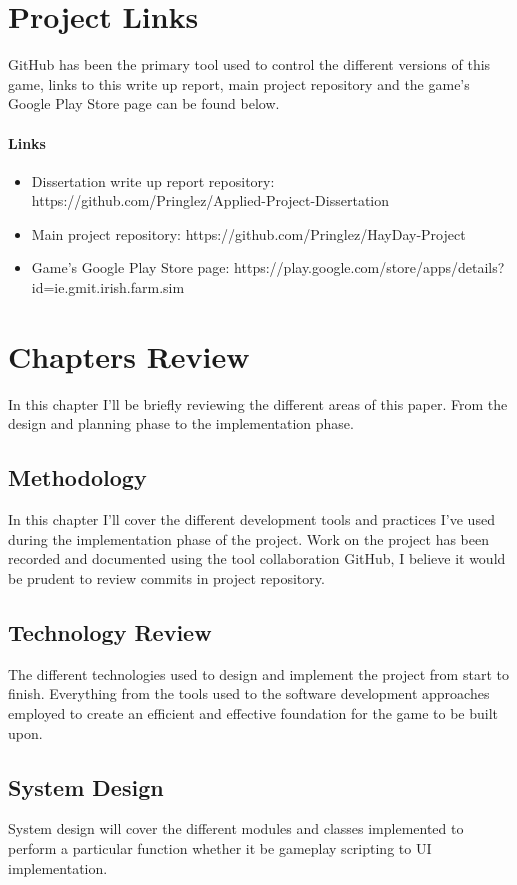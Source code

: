 \section{Project Links}
GitHub has been the primary tool used to control the different versions of this game, links to this write up report, main project repository and the game's Google Play Store page can be found below.
\paragraph{Links}

\begin{itemize}
	\item Dissertation write up report repository: https://github.com/Pringlez/Applied-Project-Dissertation
	\item Main project repository: https://github.com/Pringlez/HayDay-Project
	\item Game's Google Play Store page: https://play.google.com/store/apps/details?id=ie.gmit.irish.farm.sim
\end{itemize}

\section{Chapters Review}
In this chapter I'll be briefly reviewing the different areas of this paper. From the design and planning phase to the implementation phase.
\subsection{Methodology}
In this chapter I'll cover the different development tools and practices I've used during the implementation phase of the project. Work on the project has been recorded and documented using the tool collaboration GitHub, I believe it would be prudent to review commits in project repository.
\subsection{Technology Review}
The different technologies used to design and implement the project from start to finish. Everything from the tools used to the software development approaches employed to create an efficient and effective foundation for the game to be built upon.
\subsection{System Design}
System design will cover the different modules and classes implemented to perform a particular function whether it be gameplay scripting to UI implementation.
